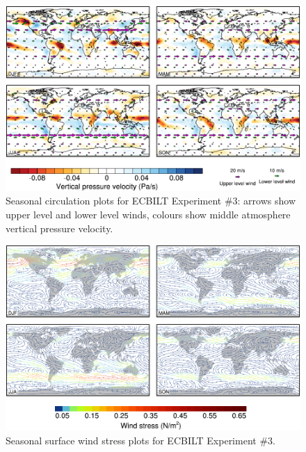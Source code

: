 \documentclass[a4paper,11pt]{article}
\begin{document}
\begin{figure}
  \begin{center}
    \includegraphics[width=\textwidth]{../expt-3/plots/wind-plots}
  \end{center}
  \caption{Seasonal circulation plots for ECBILT Experiment \#3:
    arrows show upper level and lower level winds, colours show middle
    atmosphere vertical pressure velocity.}
  \label{fig:wind-3}
\end{figure}

\begin{figure}
  \begin{center}
    \includegraphics[width=\textwidth]{../expt-3/plots/stress-plots}
  \end{center}
  \caption{Seasonal surface wind stress plots for ECBILT Experiment
    \#3.}
  \label{fig:stress-3}
\end{figure}

\appendix
\end{document}
